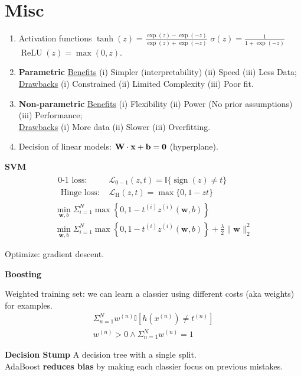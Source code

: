\documentclass[4pt]{article}
\begin{document}
	\section{Misc}
	\begin{enumerate}
		\item Activation functions $\tanh (z)=\frac{\exp (z)-\exp (-z)}{\exp (z)+\exp (-z)}$ \quad $\sigma(z)=\frac{1}{1+\exp (-z)}$ \quad $\operatorname{ReLU}(z)=\max (0, z)$.
		\item \textbf{Parametric} \ul{Benefits} (i) Simpler (interpretability) (ii) Speed (iii) Less Data; 
		\\ \ul{Drawbacks} (i) Constrained (ii) Limited Complexity (iii) Poor fit.
		\item \textbf{Non-parametric} \ul{Benefits} (i) Flexibility (ii) Power (No prior assumptions) (iii) Performance;
		\\ \ul{Drawbacks} (i) More data (ii) Slower (iii) Overfitting.
		\item Decision of linear models: $\textbf{W} \cdot \textbf{x} + \textbf{b} = \textbf{0}$ (hyperplane).
	\end{enumerate}
	\begin{minipage}[t]{0.3\linewidth}
		\textbf{SVM}
		\begin{align*}
			\begin{aligned} \text {0-1 loss: } & \mathcal{L}_{0-1}(z, t)=\mathbb{I}\{\operatorname{sign}(z) \neq t\} \\ \text { Hinge loss: } & \mathcal{L}_{\mathrm{H}}(z, t)=\max \{0,1-z t\} \end{aligned} \\
			\min _{\mathbf{w}, b} \Sigma_{i=1}^{N} \max \left\{0,1-t^{(i)} z^{(i)}(\mathbf{w}, b)\right\} \\
			\min _{\mathbf{w}, b} \Sigma_{i=1}^{N} \max \left\{0,1-t^{(i)} z^{(i)}(\mathbf{w}, b)\right\}+\frac{\lambda}{2}\|\mathbf{w}\|_{2}^{2}
		\end{align*}
		\par Optimize: gradient descent.
	\end{minipage}
	\vline
	\begin{minipage}[t]{0.3\linewidth}
		\textbf{Boosting} \\
		\par Weighted training set: we can learn a classier using different costs (aka weights) for examples.
		\begin{align*}
			\Sigma_{n=1}^{N} w^{(n)} \mathbb{I}[h(x^{(n)}) \neq t^{(n)}] \\
			w^(n) > 0 \land \Sigma_{n=1}^{N} w^{(n)}=1
		\end{align*}
		\par \textbf{Decision Stump} A decision tree with a single split. \\
		AdaBoost \textbf{reduces bias} by making each classier focus on previous mistakes.
	\end{minipage}
\end{document}
